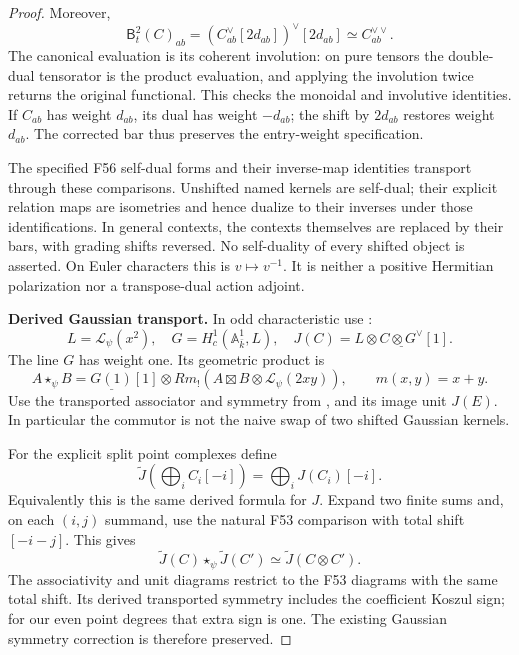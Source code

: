 \begin{proof}
Moreover,
\[
 \mathsf B_t^2(C)_{ab}
   =(C_{ab}^\vee[2d_{ab}])^\vee[2d_{ab}]
   \simeq C_{ab}^{\vee\vee}.
\]
The canonical evaluation is its coherent involution:
on pure tensors the double-dual tensorator is the
product evaluation, and applying the involution twice
returns the original functional. This checks the
monoidal and involutive identities.
If \(C_{ab}\) has weight \(d_{ab}\), its dual has
weight \(-d_{ab}\); the shift by \(2d_{ab}\)
restores weight \(d_{ab}\). The corrected bar thus
preserves the entry-weight specification.

The specified F56 self-dual forms and their inverse-map
identities transport through these comparisons.
Unshifted named kernels are self-dual; their explicit
relation maps are isometries and hence dualize to
their inverses under those identifications.
In general contexts, the contexts themselves are
replaced by their bars, with grading shifts reversed.
No self-duality of every shifted object is asserted.
On Euler characters this is \(v\mapsto v^{-1}\).
It is neither a positive Hermitian polarization nor
a transpose-dual action adjoint.

\par\smallskip\noindent\textbf{Derived Gaussian transport.}\quad
In odd characteristic use :
\[
 L=\mathcal L_\psi(x^2),\quad
 G=H_c^1(\mathbb A^1_{\bar k},L),\quad
 J(C)=L\otimes\underline{C\otimes G^\vee}[1].
\]
The line \(G\) has weight one. Its geometric product is
\[
 A\star_\psi B=
 \underline{G(1)}[1]\otimes
 Rm_!\left(A\boxtimes B\otimes\mathcal L_\psi(2xy)\right),
 \qquad m(x,y)=x+y.
\]
Use the transported associator and symmetry from
, and its image unit \(J(E)\).
In particular the commutor is not the naive swap of
two shifted Gaussian kernels.

For the explicit split point complexes define
\[
 \widetilde J\left(\bigoplus_i C_i[-i]\right)
       =\bigoplus_i J(C_i)[-i].
\]
Equivalently this is the same derived formula for \(J\).
Expand two finite sums and, on each \((i,j)\) summand,
use the natural F53 comparison with total shift
\([-i-j]\). This gives
\[
 \widetilde J(C)\star_\psi\widetilde J(C')
       \simeq\widetilde J(C\otimes C').
\]
The associativity and unit diagrams restrict to the
F53 diagrams with the same total shift.
Its derived transported symmetry includes the
coefficient Koszul sign; for our even point degrees
that extra sign is one. The existing Gaussian
symmetry correction is therefore preserved.


\end{proof}
